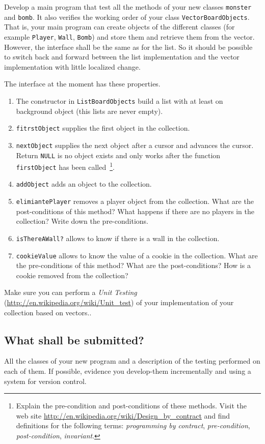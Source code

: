 \documentclass[article,12pt]{article}
\begin{document}
Develop a main program that test all the methods of your new classes
{\tt monster} and {\tt bomb}.
It also verifies the working order of your class
{\tt VectorBoardObjects}.
That is, your main program can create objects of the different classes
(for example {\tt Player}, {\tt Wall}, {\tt Bomb}) and store them and
retrieve them from the vector.
However, the interface shall be the same as for the list. So it should
be possible to switch back and forward between the list implementation
and the vector implementation with little localized change.

The interface at the moment has these properties.
\begin{enumerate}
\item The constructor in 
{\tt ListBoardObjects} build a list with at least on background object
 (this lists are never empty).
\item {\tt fitrstObject} supplies the first object in the collection.
\item {\tt nextObject} supplies the next object after a cursor and
advances the cursor. Return {\tt NULL} is no object exists and only
works after the function
{\tt firstObject} has been called~\footnote{
Explain the pre-condition and post-conditions of these methods.
Visit the web site \url{http://en.wikipedia.org/wiki/Design_by_contract}
and find definitions for the following terms:
{\em programming by contract}, {\em pre-condition}, {\em 
post-condition},
{\em invariant}.
}.
\item {\tt addObject} adds an object to the collection.
\item {\tt elimiantePlayer} removes a player object from the collection.
What are the post-conditions of this method? What happens if there
are no players in the collection? Write down the pre-conditions.
\item {\tt isThereAWall?} allows to know if there is a wall in the collection.
\item {\tt cookieValue} allows to know the value of a cookie in the
collection. What are the pre-conditions of this method?
What are the post-conditions?
How is a cookie removed from the collection?
\end{enumerate}

Make sure you can perform a {\em Unit Testing}
({\small \url{http://en.wikipedia.org/wiki/Unit_test}})
  of your implementation of your collection based on vectors..
\subsection*{What shall be submitted?}
All the classes of your new program and a description of the testing
performed on each of them.
If possible, evidence you develop-them incrementally and
using a system for version control.
\end{document}
